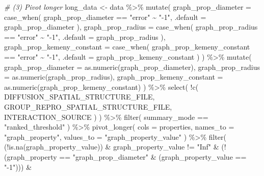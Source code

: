 \documentclass[
]{book}
\newenvironment{Shaded}{\begin{snugshade}}{\end{snugshade}}
\newcommand{\AttributeTok}[1]{\textcolor[rgb]{0.77,0.63,0.00}{#1}}
\newcommand{\CommentTok}[1]{\textcolor[rgb]{0.56,0.35,0.01}{\textit{#1}}}
\newcommand{\FunctionTok}[1]{\textcolor[rgb]{0.00,0.00,0.00}{#1}}
\newcommand{\NormalTok}[1]{#1}
\newcommand{\OtherTok}[1]{\textcolor[rgb]{0.56,0.35,0.01}{#1}}
\newcommand{\SpecialCharTok}[1]{\textcolor[rgb]{0.00,0.00,0.00}{#1}}
\newcommand{\StringTok}[1]{\textcolor[rgb]{0.31,0.60,0.02}{#1}}
\begin{document}
\begin{Shaded}
\begin{Highlighting}[]
\CommentTok{\# (3) Pivot longer}
\NormalTok{long\_data }\OtherTok{\textless{}{-}}\NormalTok{ data }\SpecialCharTok{\%\textgreater{}\%}
  \FunctionTok{mutate}\NormalTok{(}
    \AttributeTok{graph\_prop\_diameter =} \FunctionTok{case\_when}\NormalTok{(}
\NormalTok{      graph\_prop\_diameter }\SpecialCharTok{==} \StringTok{"error"} \SpecialCharTok{\textasciitilde{}} \StringTok{"{-}1"}\NormalTok{,}
      \AttributeTok{.default =}\NormalTok{ graph\_prop\_diameter}
\NormalTok{    ),}
    \AttributeTok{graph\_prop\_radius =} \FunctionTok{case\_when}\NormalTok{(}
\NormalTok{      graph\_prop\_radius }\SpecialCharTok{==} \StringTok{"error"} \SpecialCharTok{\textasciitilde{}} \StringTok{"{-}1"}\NormalTok{,}
      \AttributeTok{.default =}\NormalTok{ graph\_prop\_radius}
\NormalTok{    ),}
    \AttributeTok{graph\_prop\_kemeny\_constant =} \FunctionTok{case\_when}\NormalTok{(}
\NormalTok{      graph\_prop\_kemeny\_constant }\SpecialCharTok{==} \StringTok{"error"} \SpecialCharTok{\textasciitilde{}} \StringTok{"{-}1"}\NormalTok{,}
      \AttributeTok{.default =}\NormalTok{ graph\_prop\_kemeny\_constant}
\NormalTok{    )}
\NormalTok{  ) }\SpecialCharTok{\%\textgreater{}\%}
  \FunctionTok{mutate}\NormalTok{(}
    \AttributeTok{graph\_prop\_diameter =} \FunctionTok{as.numeric}\NormalTok{(graph\_prop\_diameter),}
    \AttributeTok{graph\_prop\_radius =} \FunctionTok{as.numeric}\NormalTok{(graph\_prop\_radius),}
    \AttributeTok{graph\_prop\_kemeny\_constant =} \FunctionTok{as.numeric}\NormalTok{(graph\_prop\_kemeny\_constant)}
\NormalTok{  ) }\SpecialCharTok{\%\textgreater{}\%}
  \FunctionTok{select}\NormalTok{(}
    \SpecialCharTok{!}\FunctionTok{c}\NormalTok{(}
\NormalTok{      DIFFUSION\_SPATIAL\_STRUCTURE\_FILE,}
\NormalTok{      GROUP\_REPRO\_SPATIAL\_STRUCTURE\_FILE,}
\NormalTok{      INTERACTION\_SOURCE}
\NormalTok{    )}
\NormalTok{  ) }\SpecialCharTok{\%\textgreater{}\%}
  \FunctionTok{filter}\NormalTok{(}
\NormalTok{    summary\_mode }\SpecialCharTok{==} \StringTok{"ranked\_threshold"}
\NormalTok{  ) }\SpecialCharTok{\%\textgreater{}\%}
  \FunctionTok{pivot\_longer}\NormalTok{(}
    \AttributeTok{cols =}\NormalTok{ properties,}
    \AttributeTok{names\_to =} \StringTok{"graph\_property"}\NormalTok{,}
    \AttributeTok{values\_to =} \StringTok{"graph\_property\_value"}
\NormalTok{  ) }\SpecialCharTok{\%\textgreater{}\%}
  \FunctionTok{filter}\NormalTok{(}
\NormalTok{    (}\SpecialCharTok{!}\FunctionTok{is.na}\NormalTok{(graph\_property\_value)) }\SpecialCharTok{\&}\NormalTok{ graph\_property\_value }\SpecialCharTok{!=} \StringTok{"Inf"} \SpecialCharTok{\&}
\NormalTok{    (}\SpecialCharTok{!}\NormalTok{(graph\_property }\SpecialCharTok{==} \StringTok{"graph\_prop\_diameter"} \SpecialCharTok{\&}\NormalTok{ (graph\_property\_value }\SpecialCharTok{==} \StringTok{"{-}1"}\NormalTok{))) }\SpecialCharTok{\&}

\end{Highlighting}
\end{Shaded}
\end{document}
